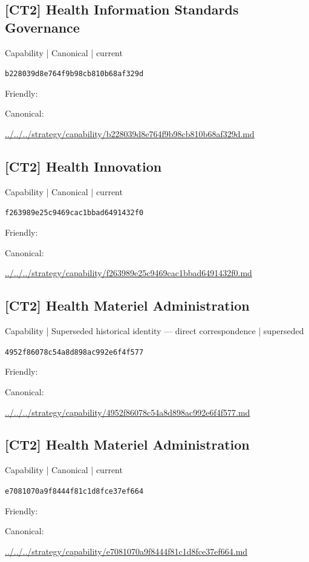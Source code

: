 \documentclass[10pt,a4paper]{article}
\begin{document}
\subsection*{[CT2] Health Information Standards Governance}
{\small Capability | Canonical | current}\par
\texttt{b228039d8e764f9b98cb810b68af329d}\par
Friendly: \par
Canonical: \par
{\footnotesize\url{../../../strategy/capability/b228039d8e764f9b98cb810b68af329d.md}}\par
\subsection*{[CT2] Health Innovation}
{\small Capability | Canonical | current}\par
\texttt{f263989e25c9469cac1bbad6491432f0}\par
Friendly: \par
Canonical: \par
{\footnotesize\url{../../../strategy/capability/f263989e25c9469cac1bbad6491432f0.md}}\par
\subsection*{[CT2] Health Materiel Administration}
{\small Capability | Superseded historical identity — direct correspondence | superseded}\par
\texttt{4952f86078c54a8d898ac992e6f4f577}\par
Friendly: \par
Canonical: \par
{\footnotesize\url{../../../strategy/capability/4952f86078c54a8d898ac992e6f4f577.md}}\par
\subsection*{[CT2] Health Materiel Administration}
{\small Capability | Canonical | current}\par
\texttt{e7081070a9f8444f81c1d8fce37ef664}\par
Friendly: \par
Canonical: \par
{\footnotesize\url{../../../strategy/capability/e7081070a9f8444f81c1d8fce37ef664.md}}\par
\end{document}
